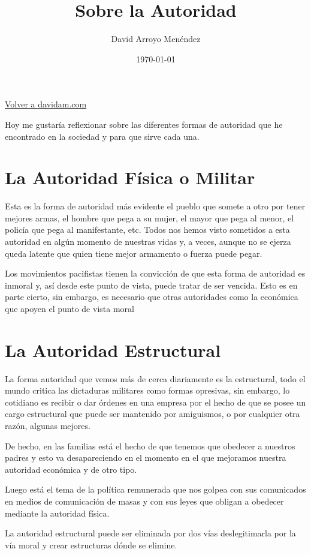 \documentclass[11pt]{article}
\author{David Arroyo Menéndez}
\date{\today}
\title{Sobre la Autoridad}
\begin{document}
\maketitle
\tableofcontents

\href{http://www.davidam.com}{Volver a davidam.com}

Hoy me gustaría reflexionar sobre las diferentes formas de autoridad
que he encontrado en la sociedad y para que sirve cada una.

\section{La Autoridad Física o Militar}
\label{sec-1}

Esta es la forma de autoridad más evidente el pueblo que somete a otro
por tener mejores armas, el hombre que pega a su mujer, el mayor que
pega al menor, el policía que pega al manifestante, etc. Todos nos
hemos visto sometidos a esta autoridad en algún momento de nuestras
vidas y, a veces, aunque no se ejerza queda latente que quien tiene
mejor armamento o fuerza puede pegar.

Los movimientos pacifistas tienen la convicción de que esta forma de
autoridad es inmoral y, así desde este punto de vista, puede tratar de
ser vencida. Esto es en parte cierto, sin embargo, es necesario que
otras autoridades como la económica que apoyen el punto de vista moral
\section{La Autoridad Estructural}
\label{sec-2}

La forma autoridad que vemos más de cerca diariamente es la
estructural, todo el mundo critica las dictaduras militares como
formas opresivas, sin embargo, lo cotidiano es recibir o dar órdenes
en una empresa por el hecho de que se posee un cargo estructural que
puede ser mantenido por amiguismos, o por cualquier otra razón,
algunas mejores.

De hecho, en las familias está el hecho de que tenemos que obedecer a
nuestros padres y esto va desapareciendo en el momento en el que
mejoramos nuestra autoridad económica y de otro tipo.

Luego está el tema de la política remunerada que nos golpea con sus
comunicados en medios de comunicación de masas y con sus leyes que
obligan a obedecer mediante la autoridad física.

La autoridad estructural puede ser eliminada por dos vías
deslegitimarla por la vía moral y crear estructuras dónde se elimine.
\end{document}
